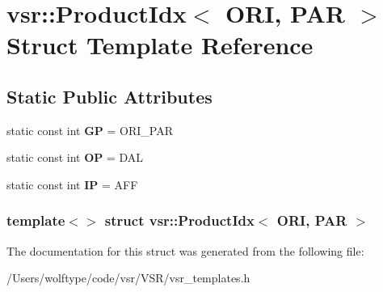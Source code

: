 \hypertarget{structvsr_1_1_product_idx_3_01_o_r_i_00_01_p_a_r_01_4}{\section{vsr\-:\-:Product\-Idx$<$ O\-R\-I, P\-A\-R $>$ Struct Template Reference}
\label{structvsr_1_1_product_idx_3_01_o_r_i_00_01_p_a_r_01_4}
}
\subsection*{Static Public Attributes}
\begin{DoxyCompactItemize}
\item 
\hypertarget{structvsr_1_1_product_idx_3_01_o_r_i_00_01_p_a_r_01_4_ab5f582c846765b81725f66cd35eee74a}{static const int {\bfseries G\-P} = O\-R\-I\-\_\-\-P\-A\-R}\label{structvsr_1_1_product_idx_3_01_o_r_i_00_01_p_a_r_01_4_ab5f582c846765b81725f66cd35eee74a}

\item 
\hypertarget{structvsr_1_1_product_idx_3_01_o_r_i_00_01_p_a_r_01_4_ad7818b84a235be48076d8fbe02b15c9b}{static const int {\bfseries O\-P} = D\-A\-L}\label{structvsr_1_1_product_idx_3_01_o_r_i_00_01_p_a_r_01_4_ad7818b84a235be48076d8fbe02b15c9b}

\item 
\hypertarget{structvsr_1_1_product_idx_3_01_o_r_i_00_01_p_a_r_01_4_a2cffa5f4699a1e3daf3606e669eb8fd9}{static const int {\bfseries I\-P} = A\-F\-F}\label{structvsr_1_1_product_idx_3_01_o_r_i_00_01_p_a_r_01_4_a2cffa5f4699a1e3daf3606e669eb8fd9}

\end{DoxyCompactItemize}
\subsubsection*{template$<$$>$ struct vsr\-::\-Product\-Idx$<$ O\-R\-I, P\-A\-R $>$}



The documentation for this struct was generated from the following file\-:\begin{DoxyCompactItemize}
\item 
/\-Users/wolftype/code/vsr/\-V\-S\-R/vsr\-\_\-templates.\-h\end{DoxyCompactItemize}
